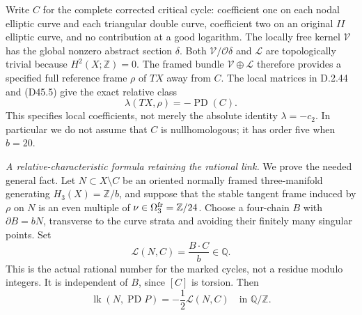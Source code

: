 Write $C$ for the complete corrected critical cycle: coefficient
one on each nodal elliptic curve and each triangular double
curve, coefficient two on an original $II$ elliptic curve,
and no contribution at a good logarithm. The locally free
kernel $\mathcal V$ has the global nonzero abstract section
$\delta$. Both $\mathcal V/\mathcal O\delta$ and $\mathcal L$
are topologically trivial because $H^2(X;\mathbb Z)=0$.
The framed bundle $\mathcal V\oplus\mathcal L$ therefore
provides a specified full reference frame $\rho$ of $TX$
away from $C$. The local matrices in D.2.44 and (D45.5) give
the exact relative class
\[
                  \lambda(TX,\rho)=-\operatorname{PD}(C).
                                                               \tag{D45.7}
\]
This specifies local coefficients, not merely the absolute
identity $\lambda=-c_2$. In particular we do not assume
that $C$ is nullhomologous; it has order five when $b=20$.

\emph{A relative-characteristic formula retaining the rational link.}
We prove the needed general fact. Let $N\subset X\setminus C$
be an oriented normally framed three-manifold generating
$H_3(X)=\mathbb Z/b$, and suppose that the stable tangent
frame induced by $\rho$ on $N$ is an even multiple of
$\nu\in\Omega^{\rm fr}_3=\mathbb Z/24$.
Choose a four-chain $B$ with $\partial B=bN$, transverse to
the curve strata and avoiding their finitely many singular
points. Set
\[
                     \mathcal L(N,C)=\frac{B\cdot C}{b}
                             \in\mathbb Q.                  \tag{D45.8}
\]
This is the actual rational number for the marked cycles,
not a residue modulo integers. It is independent of $B$,
since $[C]$ is torsion. Then
\[
       \operatorname{lk}(N,\operatorname{PD}P)
                          =-\frac12\mathcal L(N,C)
                             \quad\text{in }\mathbb Q/\mathbb Z.
                                                               \tag{D45.9}
\]

